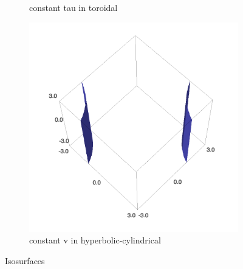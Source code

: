 \documentclass{article}
\begin{document}
\begin{figure}
\begin{subfigure}[b]{0.3\textwidth}
        \caption{constant tau in toroidal}
    \end{subfigure}
    \begin{subfigure}[b]{0.3\textwidth}
        \includegraphics[width=\textwidth]{images/hyperbolic_v.png}
        \caption{constant v in hyperbolic-cylindrical}
    \end{subfigure}
\caption{Isosurfaces}
\end{figure}
\end{document}
